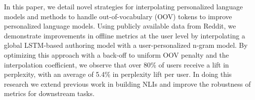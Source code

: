In this paper, we detail novel strategies for interpolating personalized language models and methods to handle out-of-vocabulary (OOV) tokens to improve personalized language models. Using publicly available data from Reddit, we demonstrate improvements in offline metrics at the user level by interpolating a global LSTM-based authoring model with a user-personalized n-gram model. By optimizing this approach with a back-off to uniform OOV penalty and the interpolation coefficient, we observe that over 80\% of users receive a lift in perplexity, with an average of 5.4\% in perplexity lift per user. In doing this research we extend previous work in building NLIs and improve the robustness of metrics for downstream tasks.
